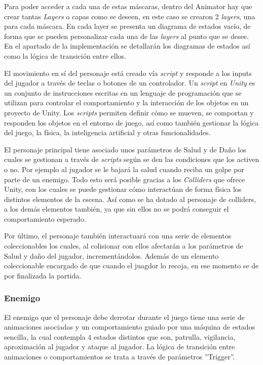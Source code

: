 Para poder acceder a cada una de estas máscaras, dentro del Animator hay que crear tantas \textit{Layers} o capas como se deseen, en este caso se crearon 2 \textit{layers}, una para cada máscara. En cada layer se presenta un diagrama de estados vacío, de forma que se pueden personalizar cada una de las \textit{layers} al punto que se desee. En el apartado de la implementación se detallarán los diagramas de estados así como la lógica de transición entre ellos.

El movimiento en sí del personaje está creado vía \textit{script} y responde a los inputs del jugador a través de teclas o botones de un controlador. Un \textit{script} en \textit{Unity} es un conjunto de instrucciones escritas en un lenguaje de programación que se utilizan para controlar el comportamiento y la interacción de los objetos en un proyecto de Unity. Los \textit{scripts} permiten definir cómo se mueven, se comportan y responden los objetos en el entorno de juego, así como también gestionar la lógica del juego, la física, la inteligencia artificial y otras funcionalidades.

El personaje principal tiene asociado unos parámetros de Salud y de Daño los cuales se gestionan a través de \textit{scripts} según se den las condiciones que los activen o no. Por ejemplo al jugador se le bajará la salud cuando reciba un golpe por parte de un enemigo. Todo esto será posible gracias a los \textit{Colliders} que ofrece Unity, con los cuales se puede gestionar cómo interactúan de forma física los distintos elementos de la escena. Así como se ha dotado al personaje de colliders, a los demás elementos también, ya que sin ellos no se podrá conseguir el comportamiento esperado.

Por último, el personaje también interactuará con una serie de elementos coleccionables los cuales, al colisionar con ellos afectarán a los parámetros de Salud y daño del jugador, incrementándolos. Además de un elemento coleccionable encargado de que cuando el juagdor lo recoja, en ese momento se de por finalizada la partida.

\subsubsection{Enemigo}

El enemigo que el personaje debe derrotar durante el juego tiene una serie de animaciones asociadas y un comportamiento guiado por una máquina de estados sencilla, la cual contempla 4 estados distintos que son, patrulla, vigilancia, aproximación al jugador y ataque al jugador. La lógica de transición entre animaciones o comportamientos se trata a través de parámetros ''Trigger''. 

